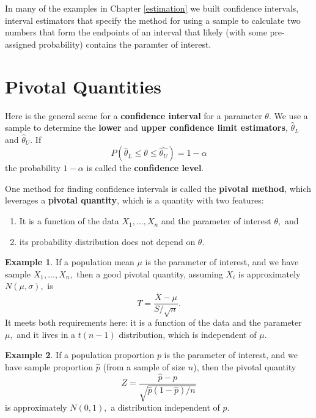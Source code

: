 \documentclass[
]{book}
\providecommand{\tightlist}{%
  \setlength{\itemsep}{0pt}\setlength{\parskip}{0pt}}
\theoremstyle{definition}
\theoremstyle{definition}
\newtheorem{example}{Example}[chapter]
\theoremstyle{definition}
\theoremstyle{definition}
\theoremstyle{remark}
\begin{document}
In many of the examples in Chapter \ref{estimation} we built confidence intervals, interval estimators that specify the method for using a sample to calculate two numbers that form the endpoints of an interval that likely (with some pre-assigned probability) contains the paramter of interest.

\section{Pivotal Quantities}\label{pivotal-quantities}

Here is the general scene for a \textbf{confidence interval} for a parameter \(\theta\). We use a sample to determine the \textbf{lower} and \textbf{upper confidence limit estimators}, \(\hat{\theta}_L\) and \(\hat{\theta}_U\). If \[P(\hat{\theta}_L \leq \theta \leq \hat{\theta_U}) = 1 - \alpha\] the probability \(1-\alpha\) is called the \textbf{confidence level}.

One method for finding confidence intervals is called the \textbf{pivotal method}, which leverages a \textbf{pivotal quantity}, which is a quantity with two features:

\begin{enumerate}
\def\labelenumi{\arabic{enumi}.}
\tightlist
\item
  It is a function of the data \(X_1, \ldots, X_n\) and the parameter of interest \(\theta,\) and
\item
  its probability distribution does not depend on \(\theta\).
\end{enumerate}

\begin{example}
If a population mean \(\mu\) is the parameter of interest, and we have sample \(X_1, \ldots, X_n,\) then a good pivotal quantity, assuming \(X_i\) is approximately \(N(\mu,\sigma),\) is \[T = \frac{\overline{X}-\mu}{S/\sqrt{n}}.\] It meets both requirements here: it is a function of the data and the parameter \(\mu,\) and it lives in a \(t(n-1)\) distribution, which is independent of \(\mu\).
\end{example}

\begin{example}
If a population proportion \(p\) is the parameter of interest, and we have sample proportion \(\hat{p}\) (from a sample of size \(n\)), then the pivotal quantity \[Z = \frac{\hat{p}-p}{\sqrt{\hat{p}(1-\hat{p})/n}}\] is approximately \(N(0,1),\) a distribution independent of \(p\).
\end{example}
\end{document}

